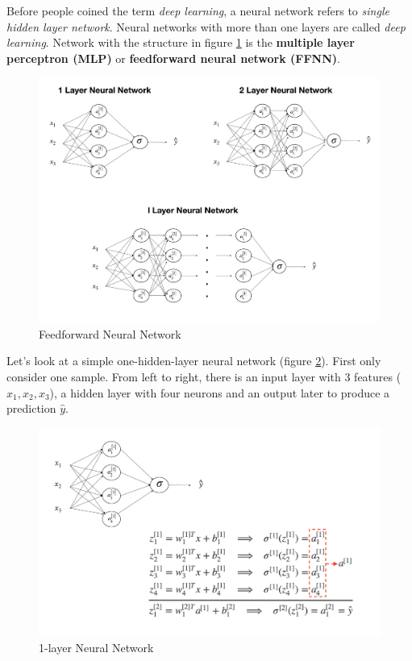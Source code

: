 \documentclass[12pt,]{krantz}
\begin{document}
Before people coined the term \emph{deep learning}, a neural network refers to \emph{single hidden layer network}. Neural networks with more than one layers are called \emph{deep learning}. Network with the structure in figure \ref{fig:ffnn} is the \textbf{multiple layer perceptron (MLP)} or \textbf{feedforward neural network (FFNN)}.

\begin{figure}

{\centering \includegraphics[width=0.8\linewidth]{images/dnn_str} 

}

\caption{Feedforward Neural Network}\label{fig:ffnn}
\end{figure}

Let's look at a simple one-hidden-layer neural network (figure \ref{fig:onelayernn}). First only consider one sample. From left to right, there is an input layer with 3 features (\(x_1, x_2, x_3\)), a hidden layer with four neurons and an output later to produce a prediction \(\hat{y}\).

\begin{figure}

{\centering \includegraphics[width=0.8\linewidth]{images/onelayerNN} 

}

\caption{1-layer Neural Network}\label{fig:onelayernn}
\end{figure}
\end{document}
